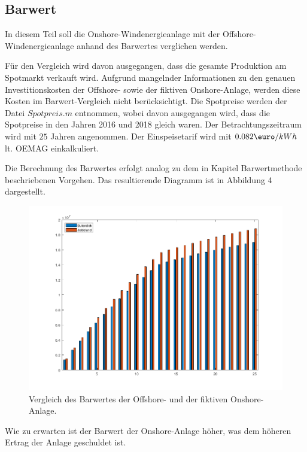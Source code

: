 \documentclass[a4paper,12pt]{article}
\begin{document}
	\subsection{Barwert}
	In diesem Teil soll die Onshore-Windenergieanlage mit der Offshore-Windenergieanlage anhand des Barwertes verglichen werden.\\ \par
	\noindent Für den Vergleich wird davon ausgegangen, dass die gesamte Produktion am Spotmarkt verkauft wird. Aufgrund mangelnder Informationen zu den genauen Investitionskosten der Offshore- sowie der fiktiven Onshore-Anlage, werden diese Kosten im Barwert-Vergleich nicht berücksichtigt.\newline
	Die Spotpreise werden der Datei $Spotpreis.m$ entnommen, wobei davon ausgegangen wird, dass die Spotpreise in den Jahren 2016 und 2018 gleich waren.
	\newline Der Betrachtungszeitraum wird mit $25$ Jahren angenommen. Der Einspeisetarif wird mit $0.082\mbox{\euro}/kWh$ lt. OEMAG einkalkuliert.\\ \par
	\noindent Die Berechnung des Barwertes erfolgt analog zu dem in Kapitel Barwertmethode beschriebenen Vorgehen.\newline
	Das resultierende Diagramm ist in Abbildung 4 dargestellt.
	\begin{figure}[H]
		\centering
		\includegraphics[width=12cm]{img/results/BarwertOnshoreOffshore}
		\caption{Vergleich des Barwertes der Offshore- und der fiktiven Onshore-Anlage.}
	\end{figure}
	\noindent Wie zu erwarten ist der Barwert der Onshore-Anlage höher, was dem höheren Ertrag der Anlage geschuldet ist.\newline
\end{document}
